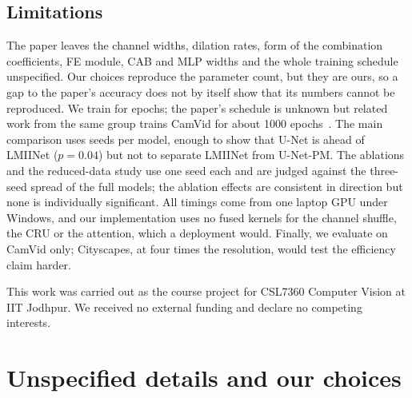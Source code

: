 \documentclass{article}
\begin{document}
\subsection{Limitations}
\label{sec:limitations}
The paper leaves the channel widths, dilation rates, form of the combination coefficients, FE
module, CAB and MLP widths and the whole training schedule unspecified. Our choices reproduce the
parameter count, but they are ours, so a gap to the paper's accuracy does not by itself show that
its numbers cannot be reproduced. We train for \Epochs{} epochs; the paper's schedule is unknown but
related work from the same group trains CamVid for about 1000 epochs~\cite{xu2023letnet}. The main
comparison uses \NumSeeds{} seeds per model, enough to show that U-Net is ahead of LMIINet
($p = 0.04$) but not to separate LMIINet from U-Net-PM. The ablations and the reduced-data study
use one seed each and are judged against the three-seed spread of the full models; the ablation
effects are consistent in direction but none is individually significant. All timings come
from one laptop GPU under Windows, and our implementation uses no fused kernels for the channel
shuffle, the CRU or the attention, which a deployment would. Finally, we evaluate on CamVid only;
Cityscapes, at four times the resolution, would test the efficiency claim harder.

\begin{ack}
This work was carried out as the course project for CSL7360 Computer Vision at IIT Jodhpur. We
received no external funding and declare no competing interests.
\end{ack}

{\small


}

\appendix

\section{Unspecified details and our choices}
\label{app:decisions}
\end{document}
